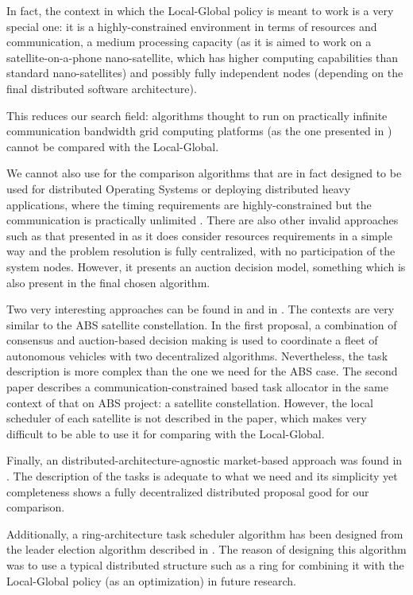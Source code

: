 In fact, the context in which the Local-Global policy is meant to work is a very special one: it is a highly-constrained environment in terms of resources and communication, a medium processing capacity (as it is aimed to work on a satellite-on-a-phone nano-satellite, which has higher computing capabilities than standard nano-satellites) and possibly fully independent nodes (depending on the final distributed software architecture).

This reduces our search field: algorithms thought to run on practically infinite communication bandwidth grid computing platforms (as the one presented in \cite{servers}) cannot be compared with the Local-Global.

We cannot also use for the comparison algorithms that are in fact designed to be used for distributed Operating Systems or deploying distributed heavy applications, where the timing requirements are highly-constrained but the communication is practically unlimited \citep{anderson2007consensus,pilloni2012decentralized}. There are also other invalid approaches such as that presented in \cite{luo2013distributed} as it does consider resources requirements in a simple way and the problem resolution is fully centralized, with no participation of the system nodes. However, it presents an auction decision model, something which is also present in the final chosen algorithm.

Two very interesting approaches can be found in \cite{choi2009consensus} and in \cite{bonnet2008coordination}. The contexts are very similar to the ABS satellite constellation. In the first proposal, a combination of consensus and auction-based decision making is used to coordinate a fleet of autonomous vehicles with two decentralized algorithms. Nevertheless, the task description is more complex than the one we need for the ABS case. The second paper describes a communication-constrained based task allocator in the same context of that on ABS project: a satellite constellation. However, the local scheduler of each satellite is not described in the paper, which makes very difficult to be able to use it for comparing with the Local-Global.

Finally, an distributed-architecture-agnostic market-based approach was found in \cite{Edalat09}. The description of the tasks is adequate to what we need and its simplicity yet completeness shows a fully decentralized distributed proposal good for our comparison.

Additionally, a ring-architecture task scheduler algorithm has been designed from the leader election algorithm described in \cite[p.~266]{Tanenbaum:2006:DSP:1202502}. The reason of designing this algorithm was to use a typical distributed structure such as a ring for combining it with the Local-Global policy (as an optimization) in future research.

